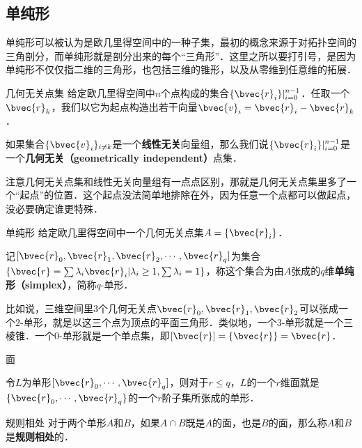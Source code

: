 

\subsection{单纯形}

单纯形可以被认为是欧几里得空间中的一种子集，最初的概念来源于对拓扑空间的三角剖分，而单纯形就是剖分出来的每个“三角形”．这里之所以要打引号，是因为单纯形不仅仅指二维的三角形，也包括三维的锥形，以及从零维到任意维的拓展．

\begin{definition}{几何无关点集}
给定欧几里得空间中$n$个点构成的集合$\{\bvec{r}_i\}|_{i=0}^{n-1}$．任取一个$\bvec{r}_k$，我们以它为起点构造出若干向量$\bvec{v}_i=\bvec{r}_i-\bvec{r}_k$．

如果集合$\{\bvec{v}_i\}_{i\not= k}$是一个\textbf{线性无关}向量组，那么我们说$\{\bvec{r}_i\}|_{i=0}^{n-1}$是一个\textbf{几何无关（geometrically independent）}点集．
\end{definition}

注意几何无关点集和线性无关向量组有一点点区别，那就是几何无关点集里多了一个“起点”的位置．这个起点没法简单地排除在外，因为任意一个点都可以做起点，没必要确定谁更特殊．

\begin{definition}{单纯形}
给定欧几里得空间中一个几何无关点集$A=\{\bvec{r}_i\}$．

记$[\bvec{r}_0, \bvec{r}_1, \bvec{r}_2, \cdots, \bvec{r}_q]$为集合$\{\bvec{r}=\sum\lambda_i\bvec{r}_i|\lambda_i\geq 1, \sum\lambda_i=1\}$，称这个集合为由$A$张成的$q$维\textbf{单纯形（simplex）}，简称$q$-单形．

\end{definition}

比如说，三维空间里$3$个几何无关点$\bvec{r}_0, \bvec{r}_1, \bvec{r}_2$可以张成一个$2$-单形，就是以这三个点为顶点的平面三角形．类似地，一个$3$-单形就是一个三棱锥．一个$0$-单形就是一个单点集，即$[\bvec{r}]=\{\bvec{r}\}=\bvec{r}$．

\begin{definition}{面}

令$L$为单形$[\bvec{r}_0, \cdots, \bvec{r}_q]$，则对于$r\leq q$，$L$的一个$r$维面就是$\{\bvec{r}_0, \cdots, \bvec{r}_q\}$的一个$r$阶子集所张成的单形．

\end{definition}


\begin{definition}{规则相处}
对于两个单形$A$和$B$，如果$A\cap B$既是$A$的面，也是$B$的面，那么称$A$和$B$是\textbf{规则相处}的．
\end{definition}


